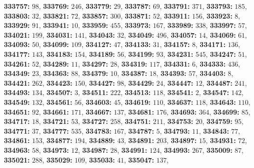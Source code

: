 \textsf{\bfseries 333757:} $98$, \textsf{\bfseries 333769:} $246$, \textsf{\bfseries 333779:} $29$, \textsf{\bfseries 333787:} $69$, \textsf{\bfseries 333791:} $371$, \textsf{\bfseries 333793:} $185$, \textsf{\bfseries 333803:} $32$, \textsf{\bfseries 333821:} $72$, \textsf{\bfseries 333857:} $300$, \textsf{\bfseries 333871:} $52$, \textsf{\bfseries 333911:} $156$, \textsf{\bfseries 333923:} $8$, \textsf{\bfseries 333929:} $91$, \textsf{\bfseries 333941:} $10$, \textsf{\bfseries 333959:} $455$, \textsf{\bfseries 333973:} $167$, \textsf{\bfseries 333989:} $338$, \textsf{\bfseries 333997:} $57$, \textsf{\bfseries 334021:} $199$, \textsf{\bfseries 334031:} $141$, \textsf{\bfseries 334043:} $32$, \textsf{\bfseries 334049:} $496$, \textsf{\bfseries 334057:} $14$, \textsf{\bfseries 334069:} $61$, \textsf{\bfseries 334093:} $50$, \textsf{\bfseries 334099:} $109$, \textsf{\bfseries 334127:} $47$, \textsf{\bfseries 334133:} $31$, \textsf{\bfseries 334157:} $8$, \textsf{\bfseries 334171:} $136$, \textsf{\bfseries 334177:} $143$, \textsf{\bfseries 334183:} $154$, \textsf{\bfseries 334189:} $56$, \textsf{\bfseries 334199:} $93$, \textsf{\bfseries 334231:} $545$, \textsf{\bfseries 334247:} $51$, \textsf{\bfseries 334261:} $52$, \textsf{\bfseries 334289:} $11$, \textsf{\bfseries 334297:} $28$, \textsf{\bfseries 334319:} $117$, \textsf{\bfseries 334331:} $6$, \textsf{\bfseries 334333:} $436$, \textsf{\bfseries 334349:} $23$, \textsf{\bfseries 334363:} $88$, \textsf{\bfseries 334379:} $10$, \textsf{\bfseries 334387:} $18$, \textsf{\bfseries 334393:} $57$, \textsf{\bfseries 334403:} $8$, \textsf{\bfseries 334421:} $262$, \textsf{\bfseries 334423:} $150$, \textsf{\bfseries 334427:} $98$, \textsf{\bfseries 334429:} $24$, \textsf{\bfseries 334447:} $12$, \textsf{\bfseries 334487:} $241$, \textsf{\bfseries 334493:} $134$, \textsf{\bfseries 334507:} $3$, \textsf{\bfseries 334511:} $222$, \textsf{\bfseries 334513:} $118$, \textsf{\bfseries 334541:} $2$, \textsf{\bfseries 334547:} $142$, \textsf{\bfseries 334549:} $132$, \textsf{\bfseries 334561:} $56$, \textsf{\bfseries 334603:} $45$, \textsf{\bfseries 334619:} $110$, \textsf{\bfseries 334637:} $118$, \textsf{\bfseries 334643:} $110$, \textsf{\bfseries 334651:} $92$, \textsf{\bfseries 334661:} $171$, \textsf{\bfseries 334667:} $137$, \textsf{\bfseries 334681:} $176$, \textsf{\bfseries 334693:} $364$, \textsf{\bfseries 334699:} $85$, \textsf{\bfseries 334717:} $18$, \textsf{\bfseries 334721:} $53$, \textsf{\bfseries 334727:} $258$, \textsf{\bfseries 334751:} $211$, \textsf{\bfseries 334753:} $20$, \textsf{\bfseries 334759:} $95$, \textsf{\bfseries 334771:} $37$, \textsf{\bfseries 334777:} $535$, \textsf{\bfseries 334783:} $167$, \textsf{\bfseries 334787:} $5$, \textsf{\bfseries 334793:} $11$, \textsf{\bfseries 334843:} $77$, \textsf{\bfseries 334861:} $153$, \textsf{\bfseries 334877:} $194$, \textsf{\bfseries 334889:} $43$, \textsf{\bfseries 334891:} $203$, \textsf{\bfseries 334897:} $15$, \textsf{\bfseries 334931:} $72$, \textsf{\bfseries 334963:} $58$, \textsf{\bfseries 334973:} $12$, \textsf{\bfseries 334987:} $28$, \textsf{\bfseries 334991:} $124$, \textsf{\bfseries 334993:} $267$, \textsf{\bfseries 335009:} $87$, \textsf{\bfseries 335021:} $288$, \textsf{\bfseries 335029:} $109$, \textsf{\bfseries 335033:} $41$, \textsf{\bfseries 335047:} $137$, 
